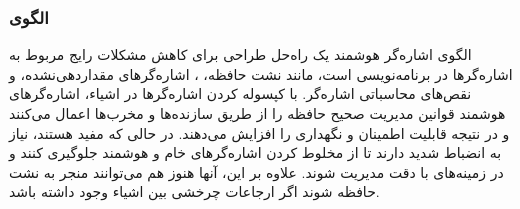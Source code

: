 \subsubsection{الگوی }
\label{memSmartPointerSec}
\begin{RTL}
الگوی اشاره‌گر هوشمند \cite{ref4}
یک راه‌حل طراحی برای کاهش مشکلات رایج مربوط به اشاره‌گرها
در برنامه‌نویسی است، مانند نشت حافظه،
، اشاره‌گرهای مقداردهی‌نشده،
و نقص‌های محاسباتی اشاره‌گر.
با کپسوله کردن اشاره‌گرها در اشیاء، اشاره‌گرهای هوشمند قوانین مدیریت
صحیح حافظه را از طریق سازنده‌ها و مخرب‌ها اعمال می‌کنند
و در نتیجه قابلیت اطمینان و نگهداری را افزایش می‌دهند.
در حالی که مفید هستند، نیاز به انضباط شدید دارند تا از مخلوط کردن
اشاره‌گرهای خام و هوشمند جلوگیری کنند و در زمینه‌های 
با دقت مدیریت شوند.
علاوه بر این، آنها هنوز هم می‌توانند منجر به نشت حافظه شوند اگر ارجاعات
چرخشی بین اشیاء وجود داشته باشد.
\end{RTL}